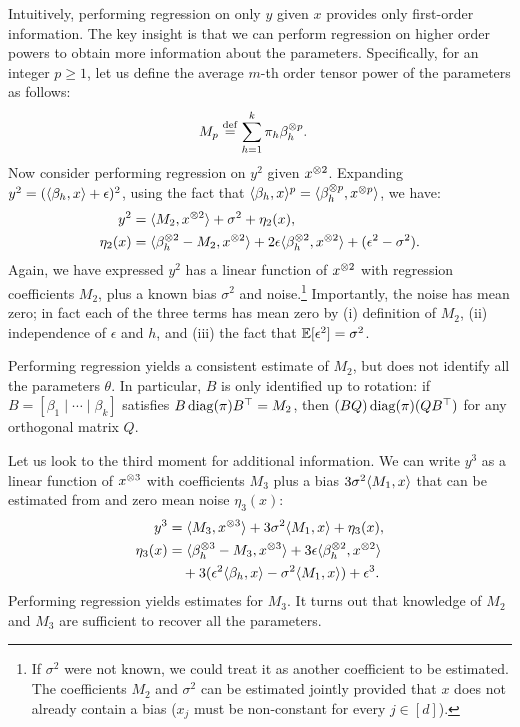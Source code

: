Intuitively, performing regression on only $y$ given $x$ provides only first-order
information.  The key insight is that we can perform regression
on higher order powers to obtain more information about the parameters.
Specifically, for an integer $p \ge 1$, let us define the average
$m$-th order tensor power of the parameters as follows:
\begin{align}
M_p &\eqdef \sum_{h=1}^k \pi_h \beta_h\tp{p}. \label{eqn:Mp} %
\end{align}
Now consider performing regression on $y^2$ given $x^{\otimes 2}$.
Expanding $y^2 = (\langle \beta_h, x \rangle + \epsilon)^2$,
using the fact that $\langle \beta_h, x \rangle^p = \langle \beta_h^{\otimes p}, x^{\otimes p} \rangle$,
we have:
\begin{align}
y^2 &= \langle M_2, x^{\otimes 2} \rangle + \sigma^2 + \eta_2(x), \label{eqn:y2} \\
\eta_2(x) &= \langle \beta_h^{\otimes 2} - M_2, x^{\otimes 2} \rangle + 2 \epsilon \langle \beta_h^{\otimes 2}, x^{\otimes 2} \rangle + (\epsilon^2 - \sigma^2). \nonumber
\end{align}
Again, we have expressed $y^2$ has a linear function of $x^{\otimes 2}$
with regression coefficients $M_2$, plus a known bias $\sigma^2$ and noise.\footnote{If $\sigma^2$ were not known,
we could treat it as another coefficient
to be estimated.  The coefficients $M_2$ and $\sigma^2$ can be estimated jointly
provided that $x$ does not already contain a bias ($x_j$ must be non-constant for every $j \in [d]$).}
Importantly, the noise has mean zero; 
in fact each of the three terms has mean zero
by (i) definition of $M_2$, (ii) independence of $\epsilon$ and $h$,
and (iii) the fact that $\operatorname{\mathbb{E}}[\epsilon^2] = \sigma^2$.

Performing regression yields a consistent estimate of $M_2$,
but does not identify all the parameters $\theta$.
In particular, $B$ is only identified up to rotation:
if $B = [\beta_1 \mid \cdots \mid \beta_k]$ satisfies
$B \operatorname{diag}(\pi) B^\top = M_2$, then $(B Q) \operatorname{diag}(\pi) (Q B^\top)$
for any orthogonal matrix $Q$.

Let us look to the third moment for additional information.
We can write $y^3$ as a linear function of $x^{\otimes 3}$ with coefficients $M_3$
plus a bias $3 \sigma^2 \langle M_1, x \rangle$ that can be estimated from  and zero mean noise $\eta_3(x)$:
\begin{align}
y^3 &= \langle M_3, x^{\otimes 3} \rangle + 3\sigma^2 \langle M_1, x \rangle + \eta_3(x), \label{eqn:y3} \\
\eta_3(x) &= \langle \beta_h^{\otimes 3} - M_3, x^{\otimes 3} \rangle
+ 3 \epsilon \langle \beta_h^{\otimes 2}, x^{\otimes 2} \rangle \nonumber \\
&\quad + 3(\epsilon^2 \langle \beta_h, x \rangle - \sigma^2 \langle M_1, x \rangle)
+ \epsilon^3. \nonumber
\end{align}
Performing regression yields estimates for $M_3$.
It turns out that knowledge of $M_2$ and $M_3$ are sufficient to recover
all the parameters.

